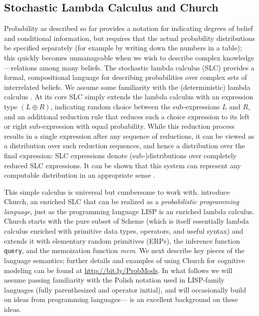 \documentclass[12pt]{article}
\begin{document}
\subsection{Stochastic Lambda Calculus and Church}

Probability as described so far provides a notation for indicating degrees of belief and conditional information, but requires that the actual probability distributions be specified separately (for example by writing down the numbers in a table); this quickly becomes unmanageable when we wish to describe complex knowledge---relations among many beliefs. 
The stochastic lambda calculus (SLC) provides a formal, compositional language for describing probabilities over complex sets of interrelated beliefs. 
We assume some familiarity with the (deterministic) lambda calculus \cite{lambda}. 
At its core SLC simply extends the lambda calculus with an expression type $(L \oplus R)$, indicating random choice between the sub-expressions $L$ and $R$, and an additional reduction rule that reduces such a choice expression to its left or right sub-expression with equal probability. 
While this reduction process results in a single expression after any sequence of reductions, it can be viewed as a distribution over such reduction sequences, and hence a distribution over the final expression: SLC expressions denote (sub-)distributions over completely reduced SLC expressions. 
It can be shown that this system can represent any computable distribution in an appropriate sense \cite[see for example][]{PfefferRamsey,FreeRoy}.

This simple calculus is universal but cumbersome to work with. 
\cite{Goodman} introduce Church, an enriched SLC that can be realized as a \emph{probabilistic programming language}, just as the programming language LISP is an enriched lambda calculus. Church starts with the pure subset of Scheme (which is itself essentially lambda calculus enriched with primitive data types, operators, and useful syntax) and extends it with elementary random primitives (ERPs), the inference function \lstinline{query}, and the memoization function \emph{mem}. 
We next describe key pieces of the language semantics; further details and examples of using Church for cognitive modeling can be found at \url{http://bit.ly/ProbMods}.
In what follows we will assume passing familiarity with the Polish notation used in LISP-family languages (fully parenthesized and operator initial), and will occasionally build on ideas from programming languages---\cite{SICP} is an excellent background on these ideas. 
\end{document}
